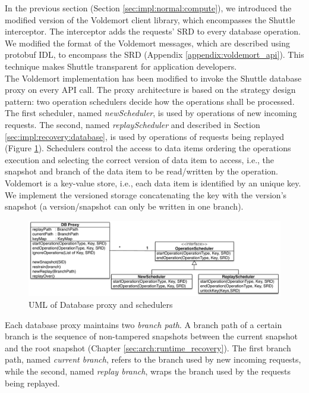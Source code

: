 In the previous section (Section \ref{sec:impl:normal:compute}), we introduced the modified version of the Voldemort client library, which encompasses the Shuttle interceptor. The interceptor adds the requests' \ac{SRD} to every database operation. We modified the format of the Voldemort messages, which are described using \ac{protobuf} \acs{IDL}, to encompass the \ac{SRD} (Appendix \ref{appendix:voldemort_api}). This technique makes Shuttle transparent for application developers.\\


The Voldemort implementation has been modified to invoke the Shuttle database proxy on every \ac{API} call. The proxy architecture is based on the strategy design pattern: two operation schedulers decide how the operations shall be processed. The first scheduler, named \emph{newScheduler}, is used by operations of new incoming requests. The second, named \emph{replayScheduler} and described in Section \ref{sec:impl:recovery:database}, is used by operations of requests being replayed (Figure \ref{fig:scheduler_uml}). Schedulers control the access to data items ordering the operations execution and selecting the correct version of data item to access, i.e., the snapshot and branch of the data item to be read/written by the operation. Voldemort is a key-value store, i.e., each data item is identified by an unique key. We implement the versioned storage concatenating the key with the version's snapshot (a version/snapshot can only be written in one branch).\\

\begin{figure}
  \centering
  \includegraphics[width=\textwidth]{arch/scheduler_uml}
  \caption{UML of Database proxy and schedulers}
  \label{fig:scheduler_uml}
\end{figure}

Each database proxy maintains two \emph{branch path}. A branch path of a certain branch is the sequence of non-tampered snapshots between the current snapshot and the root snapshot (Chapter \ref{sec:arch:runtime_recovery}). The first branch path, named \textit{current branch}, refers to the branch used by new incoming requests, while the second, named \textit{replay branch}, wraps the branch used by the requests being replayed.

